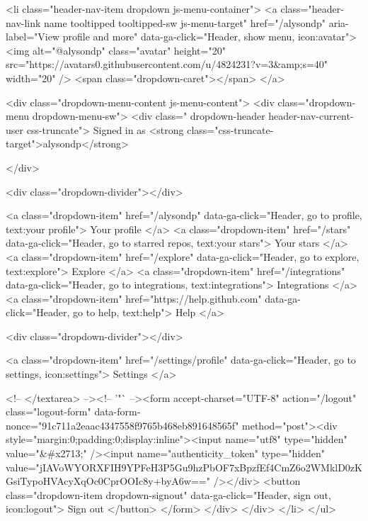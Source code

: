   <li class="header-nav-item dropdown js-menu-container">
    <a class="header-nav-link name tooltipped tooltipped-sw js-menu-target" href="/alysondp"
       aria-label="View profile and more"
       data-ga-click="Header, show menu, icon:avatar">
      <img alt="@alysondp" class="avatar" height="20" src="https://avatars0.githubusercontent.com/u/4824231?v=3&amp;s=40" width="20" />
      <span class="dropdown-caret"></span>
    </a>

    <div class="dropdown-menu-content js-menu-content">
      <div class="dropdown-menu  dropdown-menu-sw">
        <div class=" dropdown-header header-nav-current-user css-truncate">
            Signed in as <strong class="css-truncate-target">alysondp</strong>

        </div>


        <div class="dropdown-divider"></div>

          <a class="dropdown-item" href="/alysondp" data-ga-click="Header, go to profile, text:your profile">
            Your profile
          </a>
        <a class="dropdown-item" href="/stars" data-ga-click="Header, go to starred repos, text:your stars">
          Your stars
        </a>
          <a class="dropdown-item" href="/explore" data-ga-click="Header, go to explore, text:explore">
            Explore
          </a>
          <a class="dropdown-item" href="/integrations" data-ga-click="Header, go to integrations, text:integrations">
            Integrations
          </a>
        <a class="dropdown-item" href="https://help.github.com" data-ga-click="Header, go to help, text:help">
          Help
        </a>


          <div class="dropdown-divider"></div>

          <a class="dropdown-item" href="/settings/profile" data-ga-click="Header, go to settings, icon:settings">
            Settings
          </a>

          <!-- </textarea> --><!-- '"` --><form accept-charset="UTF-8" action="/logout" class="logout-form" data-form-nonce="91c711a2eaac4347558f9765b468eb891648565f" method="post"><div style="margin:0;padding:0;display:inline"><input name="utf8" type="hidden" value="&#x2713;" /><input name="authenticity_token" type="hidden" value="jIAVoWYORXFIH9YPFeH3P5Gu9hzPbOF7xBpzfEf4CmZ6o2WMklD0zKGsiTypoHVAcyXqOc0CprOOIc8y+byA6w==" /></div>
            <button class="dropdown-item dropdown-signout" data-ga-click="Header, sign out, icon:logout">
              Sign out
            </button>
</form>
      </div>
    </div>
  </li>
</ul>


